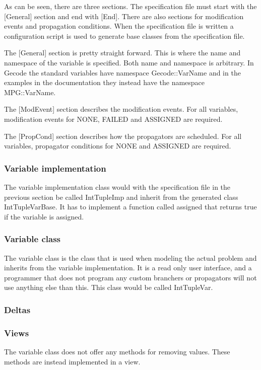 \documentclass[a4paper,11pt]{article}
\begin{document}
As can be seen, there are three sections. The specification file must start with the [General] section and end with [End]. There are also sections for modification events and propagation conditions. When the specification file is written a configuration script is used to generate base classes from the specification file.

The [General] section is pretty straight forward. This is where the name and namespace of the variable is specified. Both name and namespace is arbitrary. In Gecode the standard variables have namespace Gecode::VarName and in the examples in the documentation they instead have the namespace MPG::VarName.

The [ModEvent] section describes the modification events. For all variables, modification events for NONE, FAILED and ASSIGNED are required.

The [PropCond] section describes how the propagators are scheduled. For all variables, propagator conditions for NONE and ASSIGNED are required.

\subsubsection{Variable implementation}
The variable implementation class would with the specification file in the previous section be called IntTupleImp and inherit from the generated class IntTupleVarBase. It has to implement a function called assigned that returns true if the variable is assigned.
\subsubsection{Variable class}
The variable class is the class that is used when modeling the actual problem and inherits from the variable implementation. It is a read only user interface, and a programmer that does not program any custom branchers or propagators will not use anything else than this. This class would be called IntTupleVar.

\subsubsection{Deltas}
\subsubsection{Views}
The variable class does not offer any methods for removing values. These methods are instead implemented in a view.
\end{document}
